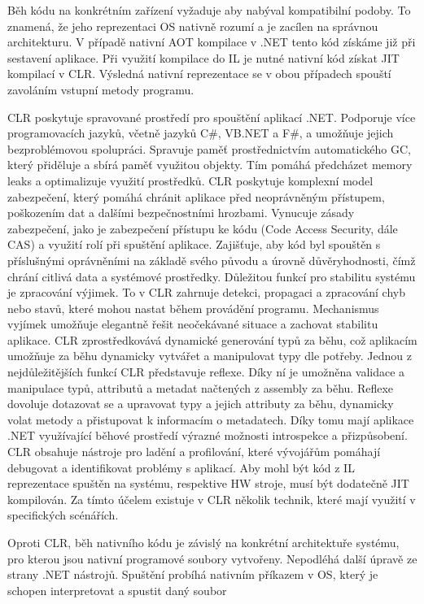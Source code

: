 
Běh kódu na konkrétním zařízení vyžaduje aby nabýval kompatibilní podoby. To znamená, že jeho reprezentaci OS nativně rozumí a je zacílen na správnou architekturu. V případě nativní AOT kompilace v .NET tento kód získáme již při sestavení aplikace. Při využití kompilace do IL je nutné nativní kód získat JIT kompilací v CLR. Výsledná nativní reprezentace se v obou případech spouští zavoláním vstupní metody programu.

CLR poskytuje spravované prostředí pro spouštění aplikací .NET. Podporuje více programovacích jazyků, včetně jazyků C\#, VB.NET a F\#, a umožňuje jejich bezproblémovou spolupráci. Spravuje paměť prostřednictvím automatického GC, který přiděluje a sbírá paměť využitou objekty. \cite{Richter2012} Tím pomáhá předcházet memory leaks a optimalizuje využití prostředků. CLR poskytuje komplexní model zabezpečení, který pomáhá chránit aplikace před neoprávněným přístupem, poškozením dat a dalšími bezpečnostními hrozbami. Vynucuje zásady zabezpečení, jako je zabezpečení přístupu ke kódu (Code Access Security, dále CAS) a využití rolí při spuštění aplikace. \cite{Richter2012} Zajišťuje, aby kód byl spouštěn s příslušnými oprávněními na základě svého původu a úrovně důvěryhodnosti, čímž chrání citlivá data a systémové prostředky. Důležitou funkcí pro stabilitu systému je zpracování výjimek. To v CLR zahrnuje detekci, propagaci a zpracování chyb nebo stavů, které mohou nastat během provádění programu. Mechanismus vyjímek umožňuje elegantně řešit neočekávané situace a zachovat stabilitu aplikace. CLR zprostředkovává dynamické generování typů za běhu, což aplikacím umožňuje za běhu dynamicky vytvářet a manipulovat typy dle potřeby. \cite{Richter2012} Jednou z nejdůležitějších funkcí CLR představuje reflexe. Díky ní je umožněna validace a manipulace typů, attributů a metadat načtených z assembly za běhu. Reflexe dovoluje dotazovat se a upravovat typy a jejich attributy za běhu, dynamicky volat metody a přistupovat k informacím o metadatech. Díky tomu mají aplikace .NET využívající běhové prostředí výrazné možnosti introspekce a přizpůsobení. CLR obsahuje nástroje pro ladění a profilování, které vývojářům pomáhají debugovat a identifikovat problémy s aplikací. Aby mohl být kód z IL reprezentace spuštěn na systému, respektive HW stroje, musí být dodatečně JIT kompilován. Za tímto účelem existuje v CLR několik technik, které mají využití v specifických scénářích.

Oproti CLR, běh nativního kódu je závislý na konkrétní architektuře systému, pro kterou jsou nativní programové soubory vytvořeny. Nepodléhá další úpravě ze strany .NET nástrojů. Spuštění probíhá nativním příkazem v OS, který je schopen interpretovat a spustit daný soubor

